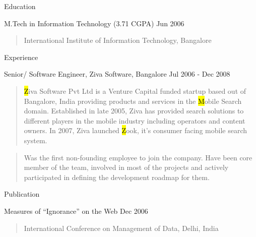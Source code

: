\documentclass{resume}
\author{Siddhartha Reddy Kothakapu}
\begin{document}
 \maketitle

\begin{category}{Education}{}

    \item {\topic M.Tech in Information Technology}
        {\footnotesize(3.71 CGPA)}
        {\period Jun 2006}
        \begin{quote}
            International Institute of Information Technology, Bangalore
        \end{quote}

\end{category}


\begin{category}{Experience}{}

    \item {\topic Senior/ Software Engineer,} Ziva Software, Bangalore
        {\period Jul 2006 - Dec 2008}
        \begin{quote}
            {\hl Ziva Software Pvt Ltd} is a Venture Capital funded startup based
            out of Bangalore, India providing products and services in the {\hl
            Mobile Search} domain. Established in late 2005, Ziva has provided
            search solutions to different players in the mobile industry including
            operators and content owners. In 2007, Ziva launched {\hl Zook}, it's
            consumer facing mobile search system.
        \end{quote}
        \begin{quote}
            Was the first non-founding employee to join the company. Have been core
            member of the team, involved in most of the projects and actively
            participated in defining the development roadmap for them.
        \end{quote}

\end{category}


\begin{category}{Publication}{}

    \item {\topic Measures of ``Ignorance'' on the Web}
        {\period Dec 2006}
        \begin{quote}
            International Conference on Management of Data, Delhi, India
        \end{quote}

\end{category}
\end{document}
